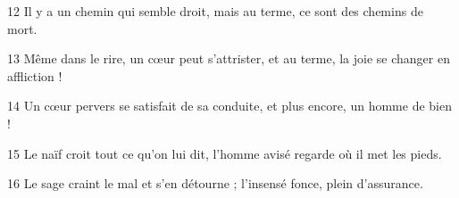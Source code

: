 
12 Il y a un chemin qui semble droit, mais au terme, ce sont des chemins de mort.

13 Même dans le rire, un cœur peut s’attrister, et au terme, la joie se changer en affliction !

14 Un cœur pervers se satisfait de sa conduite, et plus encore, un homme de bien !

15 Le naïf croit tout ce qu’on lui dit, l’homme avisé regarde où il met les pieds.

16 Le sage craint le mal et s’en détourne ; l’insensé fonce, plein d’assurance.